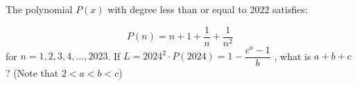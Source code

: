 The polynomial $P(x)$ with degree less than or equal to $2022$ satisfies:

\[P(n) = n + 1 + \dfrac{1}{n} + \dfrac{1}{n^2}\]for $n = 1, 2, 3, 4, ..., 2023$. If $L = 2024^2 \cdot P(2024) = 1 -\dfrac{c^a - 1}{ b}$ , what is $a + b + c$? (Note that $2 < a < b < c$)
